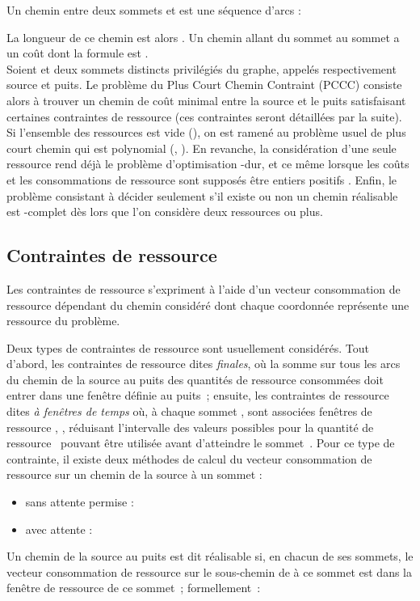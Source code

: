 \documentclass[10pt,francais]{llncs}
\begin{document}
Un chemin  entre deux sommets  et  est une s\'equence d'arcs : 

La longueur de ce chemin est alors . Un chemin  allant du sommet  au sommet  a un co\^ut dont la formule est .\\
Soient  et  deux sommets distincts privil\'egi\'es du graphe, appel\'es respectivement source et puits. Le probl\`eme du Plus Court Chemin Contraint (PCCC) consiste alors \`a trouver un chemin de co\^ut minimal entre la source et le puits satisfaisant certaines contraintes de ressource (ces contraintes seront d\'etaill\'ees par la suite). Si l'ensemble  des ressources est vide (), on est ramen\'e au probl\`eme usuel de plus court chemin qui est polynomial (\cite{Bellman1958}, \cite{Dijkstra1959}). En revanche, la consid\'eration d'une seule ressource rend d\'ej\`a le probl\`eme d'optimisation -dur, et ce m\^eme lorsque les co\^uts et les consommations de ressource sont suppos\'es \^{e}tre entiers positifs \cite{Garey1979} \cite{Dror1994}. Enfin, le probl\`eme consistant \`a d\'ecider seulement s'il existe ou non un chemin r\'ealisable est -complet d\`es lors que l'on consid\`ere deux ressources ou plus.

\subsection{Contraintes de ressource}\label{sub-desc-contrainte}
Les contraintes de ressource s'expriment \`a l'aide d'un vecteur consommation de ressource  d\'ependant du chemin consid\'er\'e dont chaque coordonn\'ee repr\'esente une ressource du probl\`eme.

Deux types de contraintes de ressource sont usuellement consid\'er\'es. Tout d'abord, les contraintes de ressource dites {\em finales}, o\`u la somme sur tous les arcs du chemin de la source au puits des quantit\'es de ressource consomm\'ees doit entrer dans une fen\^etre d\'efinie au puits~; ensuite, les contraintes de ressource dites {\em \`a fen\^etres de temps} o\`u, \`a chaque sommet , sont associ\'ees  fen\^etres de ressource , , r\'eduisant l'intervalle des valeurs possibles pour la quantit\'e de ressource~ pouvant \^etre utilis\'ee avant d'atteindre le sommet~. Pour ce type de contrainte, il existe deux m\'ethodes de calcul du vecteur consommation de ressource sur un chemin de la source \`a un sommet :
\begin{itemize}
\item sans attente permise : 
		
\item avec attente : 
		
\end{itemize}
Un chemin de la source au puits est dit r\'ealisable si, en chacun de ses sommets, le vecteur consommation de ressource sur le sous-chemin de  \`a ce sommet est dans la fen\^etre de ressource de ce sommet~; formellement~:
\end{document}
